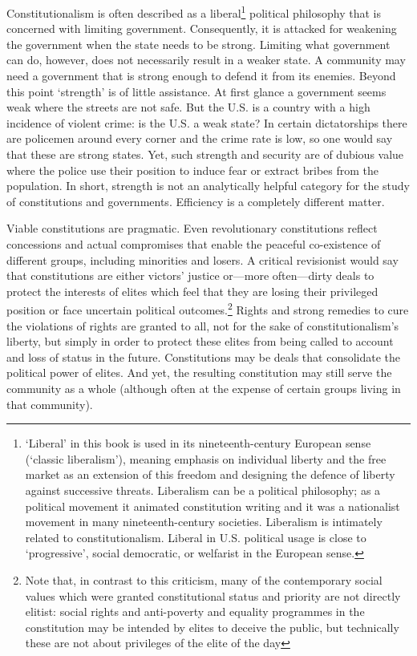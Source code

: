 \begin{multicols}{2}
\vspace{-.1cm}

\noi
Constitutionalism is often described as a liberal\footnote{‘Liberal’ in this book is used in its nineteenth-century European sense (‘classic liberalism’), meaning emphasis on individual liberty and the free market as an extension of this freedom and designing the defence of liberty against successive threats. Liberalism can be a political philosophy; as a political movement it animated
constitution writing and it was a nationalist movement in many nineteenth-century societies. Liberalism is
intimately related to constitutionalism. Liberal in U.S. political usage is close to ‘progressive’, social
democratic, or welfarist in the European sense.} political philosophy that is concerned with
limiting government. Consequently, it is attacked for weakening the government when the state needs to be strong. Limiting what government can do, however, does not necessarily
result in a weaker state. A community may need a government that is strong enough to
defend it from its enemies. Beyond this point ‘strength’ is of little assistance. At first glance
a government seems weak where the streets are not safe. But the U.S. is a country with a high
incidence of violent crime: is the U.S. a weak state? In certain dictatorships there are
policemen around every corner and the crime rate is low, so one would say that these are
strong states. Yet, such strength and security are of dubious value where the police use their
position to induce fear or extract bribes from the population. In short, strength is not an
analytically helpful category for the study of constitutions and governments. Efficiency is a
completely different matter.

\vspace{.5cm}

\noi
Viable constitutions are pragmatic. Even revolutionary constitutions reflect concessions and
actual compromises that enable the peaceful co-existence of different groups, including
minorities and losers. A critical revisionist would say that constitutions are either victors’
justice or—more often—dirty deals to protect the interests of elites which feel that they are
losing their privileged position or face uncertain political outcomes.\footnote{Note that, in contrast to this criticism, many of the contemporary social values which were granted constitutional status and priority are not directly elitist: social rights and anti-poverty and equality programmes in the constitution may be intended by elites to deceive the public, but technically these are not about privileges of the elite of the day}  Rights and strong remedies to cure the violations of rights are granted to all, not for the sake of
constitutionalism’s liberty, but simply in order to protect these elites from being called to
account and loss of status in the future. Constitutions may be deals that consolidate the
political power of elites. And yet, the resulting constitution may still serve the community as
a whole (although often at the expense of certain groups living in that community).


\end{multicols}
